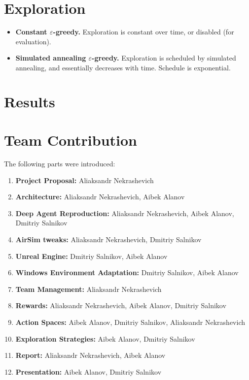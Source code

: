 \documentclass{article}
\begin{document}
\section{Exploration}

\begin{itemize}
    \item {\bf Constant $\varepsilon$-greedy.} Exploration is constant over time, or disabled (for evaluation).
    \item {\bf Simulated annealing $\varepsilon$-greedy.} Exploration is scheduled by simulated annealing, and essentially decreases with time.
        Schedule is exponential.
\end{itemize}

\section{Results}

\section{Team Contribution}

The following parts were introduced:

\begin{enumerate}
    \item {\bf Project Proposal:} Aliaksandr Nekrashevich
    \item {\bf Architecture:} Aliaksandr Nekrashevich, Aibek Alanov
    \item {\bf Deep Agent Reproduction:} Aliaksandr Nekrashevich, Aibek Alanov, Dmitriy Salnikov
    \item {\bf AirSim tweaks:} Aliaksandr Nekrashevich, Dmitriy Salnikov
    \item {\bf Unreal Engine:} Dmitriy Salnikov, Aibek Alanov
    \item {\bf Windows Environment Adaptation:} Dmitriy Salnikov, Aibek Alanov
    \item {\bf Team Management:} Aliaksandr Nekrashevich
    \item {\bf Rewards:} Aliaksandr Nekrashevich, Aibek Alanov, Dmitriy Salnikov
    \item {\bf Action Spaces:} Aibek Alanov, Dmitriy Salnikov, Aliaksandr Nekrashevich
    \item {\bf Exploration Strategies:} Aibek Alanov, Dmitriy Salnikov
    \item {\bf Report:} Aliaksandr Nekrashevich, Aibek Alanov
    \item {\bf Presentation:} Aibek Alanov, Dmitriy Salnikov
\end{enumerate}
\end{document}
